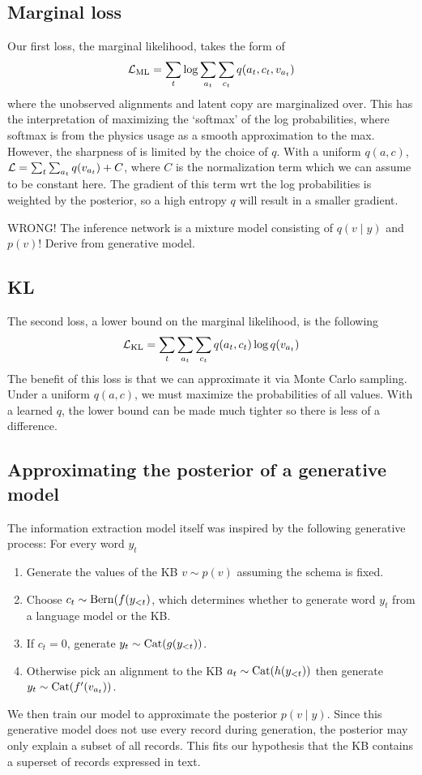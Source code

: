 \documentclass[12pt]{article}
\begin{document}
\subsection{Marginal loss}
Our first loss, the marginal likelihood, takes the form of
$$\mathcal{L}_{\textrm{ML}} = \sum_t \log \sum_{a_t} \sum_{c_t} q(a_t,c_t,v_{a_t})$$
where the unobserved alignments and latent copy are marginalized over.
This has the interpretation of maximizing the `softmax' of the 
log probabilities, where softmax is from the physics usage
as a smooth approximation to the max.
However, the sharpness of is limited by the choice of $q$.
With a uniform $q(a,c)$, $\mathcal{L} = \sum_t \sum_{a_t}q(v_{a_t}) + C$,
where $C$ is the normalization term which we can assume to be constant here.
The gradient of this term wrt the log probabilities is weighted by the posterior,
so a high entropy $q$ will result in a smaller gradient.

WRONG! The inference network is a mixture model consisting of $q(v\mid y)$ and $p(v)$!
Derive from generative model.

\subsection{KL}
The second loss, a lower bound on the marginal likelihood, is the following
$$\mathcal{L}_{\textrm{KL}} = \sum_t \sum_{a_t} \sum_{c_t} q(a_t,c_t)\log q(v_{a_t})$$
The benefit of this loss is that we can approximate it via Monte Carlo sampling.
Under a uniform $q(a,c)$, we must maximize the probabilities of all values.
With a learned $q$, the lower bound can be made much tighter so there is
less of a difference.

\subsection{Approximating the posterior of a generative model}
The information extraction model itself was inspired by the following generative process:
For every word $y_t$
\begin{enumerate}
\item Generate the values of the KB $v \sim p(v)$ assuming the schema is fixed.
\item Choose $c_t \sim \mathrm{Bern}(f(y_{<t})$, which determines whether to generate 
    word $y_t$ from a language model or the KB.
\item If $c_t = 0$, generate $y_t \sim \mathrm{Cat}(g(y_{<t}))$.
\item Otherwise pick an alignment to the KB $a_t \sim \mathrm{Cat}(h(y_{<t}))$
    then generate $y_t \sim \mathrm{Cat}(f'(v_{a_t}))$.
\end{enumerate}
We then train our model to approximate the posterior $p(v \mid y)$.
Since this generative model does not use every record during generation,
the posterior may only explain a subset of all records.
This fits our hypothesis that the KB contains a superset of records expressed in text.
\end{document}
